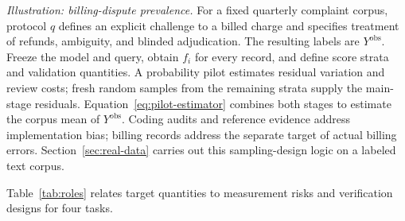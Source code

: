 \documentclass[11pt,a4paper]{article}
\begin{document}
\noindent\textit{Illustration: billing-dispute prevalence.}
For a fixed quarterly complaint corpus, protocol $q$ defines an explicit challenge to a billed charge and specifies treatment of refunds, ambiguity, and blinded adjudication. The resulting labels are $Y^{\mathrm{obs}}$. Freeze the model and query, obtain $f_i$ for every record, and define score strata and validation quantities. A probability pilot estimates residual variation and review costs; fresh random samples from the remaining strata supply the main-stage residuals. Equation~\eqref{eq:pilot-estimator} combines both stages to estimate the corpus mean of $Y^{\mathrm{obs}}$. Coding audits and reference evidence address implementation bias; billing records address the separate target of actual billing errors. Section~\ref{sec:real-data} carries out this sampling-design logic on a labeled text corpus.

Table~\ref{tab:roles} relates target quantities to measurement risks and verification designs for four tasks.
\end{document}
